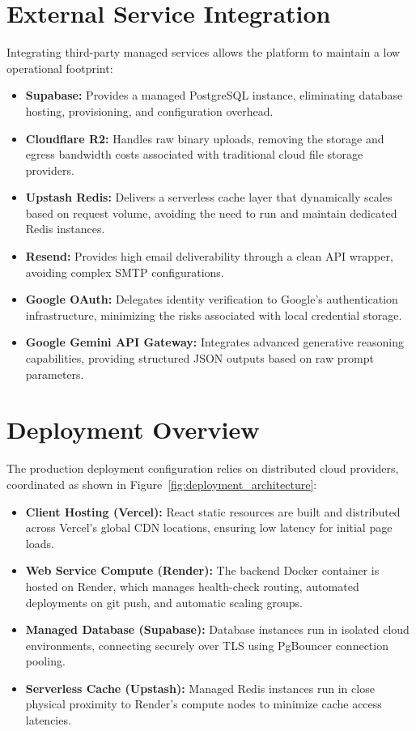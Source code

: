 \section{External Service Integration}
Integrating third-party managed services allows the platform to maintain a low operational footprint:
\begin{itemize}
    \item \textbf{Supabase:} Provides a managed PostgreSQL instance, eliminating database hosting, provisioning, and configuration overhead.
    \item \textbf{Cloudflare R2:} Handles raw binary uploads, removing the storage and egress bandwidth costs associated with traditional cloud file storage providers.
    \item \textbf{Upstash Redis:} Delivers a serverless cache layer that dynamically scales based on request volume, avoiding the need to run and maintain dedicated Redis instances.
    \item \textbf{Resend:} Provides high email deliverability through a clean API wrapper, avoiding complex SMTP configurations.
    \item \textbf{Google OAuth:} Delegates identity verification to Google's authentication infrastructure, minimizing the risks associated with local credential storage.
    \item \textbf{Google Gemini API Gateway:} Integrates advanced generative reasoning capabilities, providing structured JSON outputs based on raw prompt parameters.
\end{itemize}

\pagebreak
\section{Deployment Overview}
The production deployment configuration relies on distributed cloud providers, coordinated as shown in Figure~\ref{fig:deployment_architecture}:
\begin{itemize}
    \item \textbf{Client Hosting (Vercel):} React static resources are built and distributed across Vercel's global CDN locations, ensuring low latency for initial page loads.
    \item \textbf{Web Service Compute (Render):} The backend Docker container is hosted on Render, which manages health-check routing, automated deployments on git push, and automatic scaling groups.
    \item \textbf{Managed Database (Supabase):} Database instances run in isolated cloud environments, connecting securely over TLS using PgBouncer connection pooling.
    \item \textbf{Serverless Cache (Upstash):} Managed Redis instances run in close physical proximity to Render's compute nodes to minimize cache access latencies.
\end{itemize}

